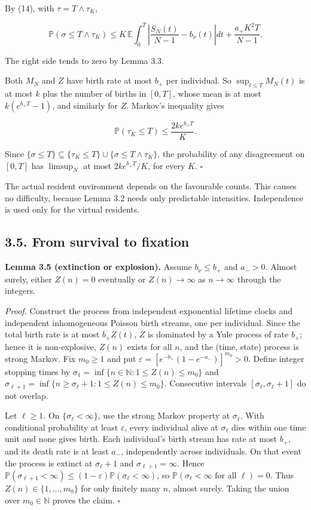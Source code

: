 \documentclass[
  british,
  11pt,
  a4paper,
]{article}
\newcounter{none} %
\begin{document}
By (14), with \(\tau=T\wedge\tau_K\),

\[
\mathbb P(\sigma\le T\wedge\tau_K)\le
K\,\mathbb E\int_0^T\left|\frac{S_N(t)}{N-1}-b_\nu(t)\right|dt+\frac{a_+K^2T}{N-1}.
\tag{18}
\]

The right side tends to zero by Lemma 3.3.

Both \(M_N\) and \(Z\) have birth rate at most \(b_+\) per individual.
So \(\sup_{t\le T}M_N(t)\) is at most \(k\) plus the number of births in
\([0,T]\), whose mean is at most \(k(e^{b_+T}-1)\), and similarly for
\(Z\). Markov's inequality gives

\[
\mathbb P(\tau_K\le T)\le\frac{2ke^{b_+T}}K.
\tag{19}
\]

Since
\(\{\sigma\le T\}\subseteq\{\tau_K\le T\}\cup\{\sigma\le T\wedge\tau_K\}\),
the probability of any disagreement on \([0,T]\) has \(\limsup_N\) at
most \(2ke^{b_+T}/K\), for every \(K\). \(\square\)

The actual resident environment depends on the favourable counts. This
causes no difficulty, because Lemma 3.2 needs only predictable
intensities. Independence is used only for the virtual residents.

\subsection{3.5. From survival to
fixation}\label{from-survival-to-fixation}

\textbf{Lemma 3.5 (extinction or explosion).} Assume \(b_\nu\le b_+\)
and \(a_->0\). Almost surely, either \(Z(n)=0\) eventually or
\(Z(n)\to\infty\) as \(n\to\infty\) through the integers.

\emph{Proof.} Construct the process from independent exponential
lifetime clocks and independent inhomogeneous Poisson birth streams, one
per individual. Since the total birth rate is at most \(b_+Z(t)\), \(Z\)
is dominated by a Yule process of rate \(b_+\); hence it is
non-explosive, \(Z(n)\) exists for all \(n\), and the (time, state)
process is strong Markov. Fix \(m_0\ge1\) and put
\(\varepsilon=[e^{-b_+}(1-e^{-a_-})]^{m_0}>0\). Define integer stopping
times by \(\sigma_1=\inf\{n\in\mathbb N:1\le Z(n)\le m_0\}\) and
\(\sigma_{\ell+1}=\inf\{n\ge\sigma_\ell+1:1\le Z(n)\le m_0\}\).
Consecutive intervals \([\sigma_\ell,\sigma_\ell+1]\) do not overlap.

Let \(\ell\ge1\). On \(\{\sigma_\ell<\infty\}\), use the strong Markov
property at \(\sigma_\ell\). With conditional probability at least
\(\varepsilon\), every individual alive at \(\sigma_\ell\) dies within
one time unit and none gives birth. Each individual's birth stream has
rate at most \(b_+\), and its death rate is at least \(a_-\),
independently across individuals. On that event the process is extinct
at \(\sigma_\ell+1\) and \(\sigma_{\ell+1}=\infty\). Hence
\(\mathbb P(\sigma_{\ell+1}<\infty)\le(1-\varepsilon)\mathbb P(\sigma_\ell<\infty)\),
so \(\mathbb P(\sigma_\ell<\infty\text{ for all }\ell)=0\). Thus
\(Z(n)\in\{1,\ldots,m_0\}\) for only finitely many \(n\), almost surely.
Taking the union over \(m_0\in\mathbb N\) proves the claim. \(\square\)
\end{document}
